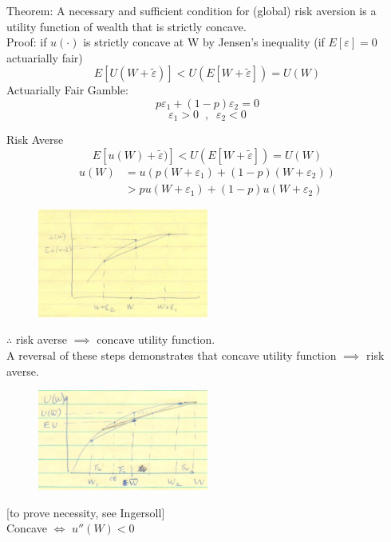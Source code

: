 \documentclass[
14pt,notheorems,hyperref={pdfauthor=whatever}
]{beamer}
\begin{document}
\begin{frame}
Theorem: A necessary and sufficient condition for (global) risk aversion is a utility function of wealth that is strictly concave.\\
\hfill \break
Proof: if $u(\cdot)$ is strictly concave at W by Jensen's inequality (if $E[\varepsilon]=0$ actuarially fair)\\
\[ E[U(W+\tilde\varepsilon)] < U(E[W+\tilde\varepsilon]) = U(W)\]
\hfill \break
Actuarially Fair Gamble:\\
\[p\varepsilon_1+(1-p)\varepsilon_2 = 0\]
\[\varepsilon_1>0\;\;,\;\;\varepsilon_2<0\]
\end{frame}

\begin{frame}
Risk Averse\\
\[ E[u(W)+\tilde\varepsilon)] < U(E[W+\tilde\varepsilon]) = U(W)\]
\begin{align*}
    u(W) &= u(p(W+\varepsilon_1)+(1-p)(W+\varepsilon_2))\\
    &> p u(W+\varepsilon_1)+(1-p)u(W+\varepsilon_2)
\end{align*}
\begin{figure}[L3-riskaverse]
    \includegraphics[width=0.5\textwidth]{L3-riskaverse}
    \centering
\end{figure}
\end{frame}

\begin{frame}
$\therefore$ risk averse $\implies$ concave utility function.\\
\hfill\break
A reversal of these steps demonstrates that concave utility function $\implies$ risk averse.\\
\begin{figure}[L3-riskaverse2]
    \includegraphics[width=0.5\textwidth]{L3-riskaverse2}
    \centering
\end{figure}
\begin{center}
    [to prove necessity, see Ingersoll]\\
    Concave $\iff$ $u''(W)<0$\\
\end{center}
\end{frame}
\end{document}

